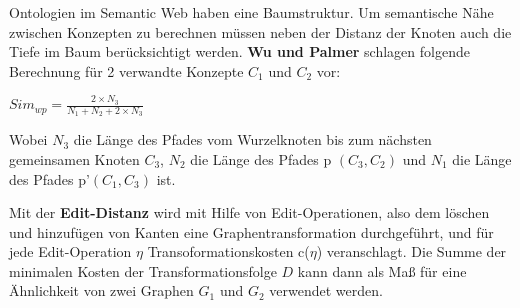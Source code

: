 Ontologien im Semantic Web haben eine Baumstruktur. Um semantische Nähe zwischen Konzepten zu berechnen müssen neben der Distanz der Knoten auch die Tiefe im Baum berücksichtigt werden. \textbf{Wu und Palmer} \cite{Wu:1994:VSL:981732.981751} schlagen folgende Berechnung für 2 verwandte Konzepte $C_{1}$ und $C_{2}$ vor:\par

\begin{center}
	$Sim_{wp}=\frac{2 \times N_{3}}{N_{1} + N_{2} + 2 \times N_{3}}$
\end{center}

Wobei $N_{3}$ die Länge des Pfades vom Wurzelknoten bis zum nächsten gemeinsamen Knoten $C_{3}$, $N_{2}$ die Länge des Pfades p $(C_{3},C_{2})$ und $N_{1}$ die Länge des Pfades p'$(C_{1},C_{3})$ ist.
\vspace{1em}

Mit der \textbf{Edit-Distanz} \cite{Krumke2012} wird mit Hilfe von Edit-Operationen, also dem löschen und hinzufügen von Kanten eine Graphentransformation durchgeführt, und für jede Edit-Operation $\eta$ Transoformationskosten c($\eta$) veranschlagt. Die Summe der minimalen Kosten der Transformationsfolge $D$ kann dann als Maß für eine Ähnlichkeit von zwei Graphen $G_{1}$ und $G_{2}$ verwendet werden.